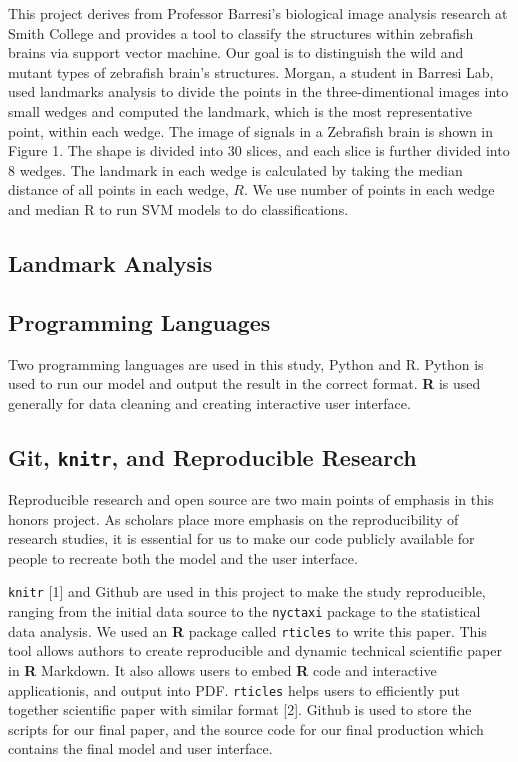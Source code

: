 \documentclass[10pt,letterpaper]{article}
\begin{document}
This project derives from Professor Barresi's biological image analysis
research at Smith College and provides a tool to classify the structures
within zebrafish brains via support vector machine. Our goal is to
distinguish the wild and mutant types of zebrafish brain's structures.
Morgan, a student in Barresi Lab, used landmarks analysis to divide the
points in the three-dimentional images into small wedges and computed
the landmark, which is the most representative point, within each wedge.
The image of signals in a Zebrafish brain is shown in Figure 1. The
shape is divided into 30 slices, and each slice is further divided into
8 wedges. The landmark in each wedge is calculated by taking the median
distance of all points in each wedge, \(R\). We use number of points in
each wedge and median R to run SVM models to do classifications.

\subsection{Landmark Analysis}\label{landmark-analysis}

\subsection{Programming Languages}\label{programming-languages}

Two programming languages are used in this study, Python and R. Python
is used to run our model and output the result in the correct format.
\textbf{R} is used generally for data cleaning and creating interactive
user interface.

\subsection{\texorpdfstring{Git, \texttt{knitr}, and Reproducible
Research}{Git, knitr, and Reproducible Research}}\label{git-knitr-and-reproducible-research}

Reproducible research and open source are two main points of emphasis in
this honors project. As scholars place more emphasis on the
reproducibility of research studies, it is essential for us to make our
code publicly available for people to recreate both the model and the
user interface.

\texttt{knitr} {[}1{]} and Github are used in this project to make the
study reproducible, ranging from the initial data source to the
\texttt{nyctaxi} package to the statistical data analysis. We used an
\textbf{R} package called \texttt{rticles} to write this paper. This
tool allows authors to create reproducible and dynamic technical
scientific paper in \textbf{R} Markdown. It also allows users to embed
\textbf{R} code and interactive applicationis, and output into PDF.
\texttt{rticles} helps users to efficiently put together scientific
paper with similar format {[}2{]}. Github is used to store the scripts
for our final paper, and the source code for our final production which
contains the final model and user interface.
\end{document}
